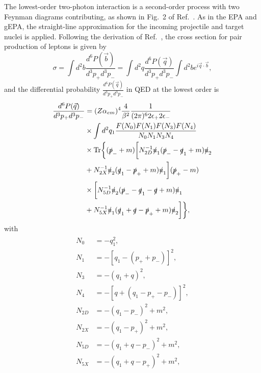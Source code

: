 \documentclass[twocolumn,epjc3]{svjour3}\sloppy
\begin{document}
The lowest-order two-photon interaction is a second-order process with two Feynman diagrams contributing, as shown in Fig.~2 of Ref.~\cite{PhysRevA.51.1874,PhysRevA.55.396}. As in the EPA and gEPA, the straight-line approximation for the incoming projectile and target nuclei is applied. 
Following the derivation of Ref.~\cite{PhysRevA.51.1874,PhysRevA.55.396}, the cross section for pair production of leptons is given by
\begin{equation}
\label{equation1_new}
    \sigma = \int d^{2}b \frac{d^{6}P(\vec{b})}{d^{3}p_{+}d^{3}p_{-}} = \int d^{2}q \frac{d^{6}P(\vec{q})}{d^{3}p_{+}d^{3}p_{-}} \int d^{2}b e^{i {\vec{q}} \cdot  {\vec{b}}},
\end{equation}
and the differential probability $\frac{d^{6}P(\vec{q})}{d^{3}p_{+}d^{3}p_{-}}$ in QED at the lowest order is 
\begin{align}
    \label{equation2_new}
    \begin{split}
        \frac{d^{6}P(\vec{q})}{d^{3}p_{+}d^{3}p_{-}} & = (Z\alpha_{em})^{4} \frac{4}{\beta^{2}} \frac{1}{(2\pi)^{6}2\epsilon_{+}2\epsilon_{-}} \\ 
        & \times \int d^{2}q_{1} \frac{F(N_{0})F(N_{1})F(N_{3})F(N_{4})}{N_{0}N_{1}N_{3}N_{4}} \\
        & \times {\rm{Tr}}\bigg\{(\slashed{p}_{-}+m)\bigg[N_{2D}^{-1}\slashed{u}_{1} (\slashed{p}_{-} - \slashed{q}_{1} + m)\slashed{u}_{2} \\
        & + N_{2X}^{-1}\slashed{u}_{2}(\slashed{q}_{1} - \slashed{p}_{+} +m)\slashed{u}_{1}\bigg] (\slashed{p}_{+}-m) \\
        & \times \bigg[N_{5D}^{-1}\slashed{u}_{2} (\slashed{p}_{-} - \slashed{q}_{1} - \slashed{q} + m)\slashed{u}_{1} \\ 
        & + N_{5X}^{-1} \slashed{u}_{1} (\slashed{q}_{1} + \slashed{q} - \slashed{p}_{+} + m)\slashed{u}_{2}\bigg] \bigg\},
    \end{split}
\end{align}
with
\begin{align}
    \label{equation3_new}
    \begin{split}
        N_{0} & = -q_{1}^{2},  \\
        N_{1} & = -[q_{1} - (p_{+}+p_{-})]^{2},\\
        N_{3} & = -(q_{1}+q)^{2}, \\
        N_{4} & = -[q+(q_{1} - p_{+} - p_{-})]^{2}, \\
        N_{2D} & = -(q_{1} - p_{-})^{2} + m^{2},\\
        N_{2X} & = -(q_{1} - p_{+})^{2} + m^{2}, \\
        N_{5D} & = -(q_{1} + q - p_{-})^{2} + m^{2},\\
        N_{5X} & = -(q_{1} + q  - p_{+})^{2} + m^{2},
    \end{split}
\end{align}
\end{document}
